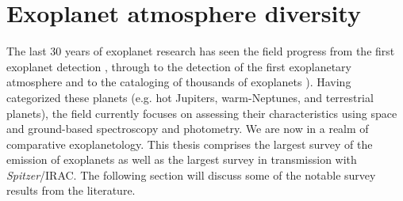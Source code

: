 
\section{Exoplanet atmosphere diversity}



The last 30 years of exoplanet research has seen the field progress from the first exoplanet detection \citep{Mayor1995}, through to the detection of the first exoplanetary atmosphere \citep{Charbonneau2002} and to the cataloging of thousands of exoplanets \citep[e.g.,][]{Borucki2010, Batalha2013}). Having categorized these planets (e.g. hot Jupiters, warm-Neptunes, and terrestrial planets), the field currently focuses on assessing their characteristics using space and ground-based spectroscopy and photometry. We are now in a realm of comparative exoplanetology. This thesis comprises the largest survey of the emission of exoplanets as well as the largest survey in transmission with \textit{Spitzer}/IRAC. The following section will discuss some of the notable survey results from the literature.

